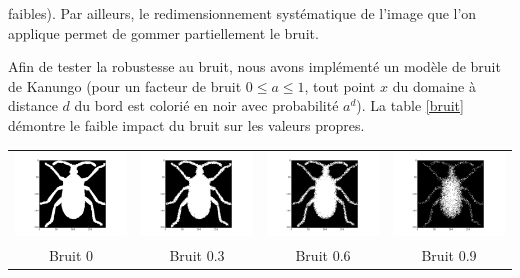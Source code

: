 \documentclass[a4paper,10pt]{article} %
\theoremstyle{definition} %
\begin{document}
 faibles). Par ailleurs, le redimensionnement systématique de l'image que l'on applique permet de gommer partiellement le bruit.


Afin de tester la robustesse au bruit, nous avons implémenté un modèle de bruit de Kanungo (pour un facteur de bruit $0 \leq a \leq 1$, tout point $x$ du domaine à distance $d$ du bord est colorié en noir avec probabilité $a^d$). La table \ref{bruit} démontre le faible impact du bruit sur les valeurs propres.

\begin{center}
  \begin{tabular}{c c c c}
    \includegraphics[scale=0.15]{noise/0.png} & \includegraphics[scale=0.15]{noise/0_3.png} & \includegraphics[scale=0.15]{noise/0_6.png} & \includegraphics[scale=0.15]{noise/0_9.png} \\
    Bruit 0 & Bruit 0.3 & Bruit 0.6 & Bruit 0.9
  \end{tabular}
\end{center}

\begin{table}[H]
  \begin{center}
    \beg
\end{center}
\end{table}
\end{document}
